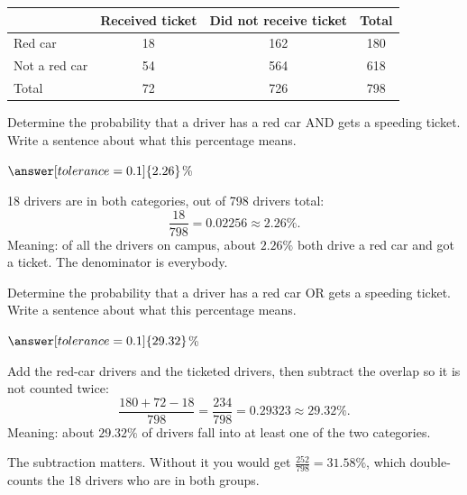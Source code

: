 \documentclass[12pt]{ximera}
\begin{document}
\begin{center}
\begin{tabular}{lccc}
\hline
 & Received ticket & Did not receive ticket & Total \\
\hline
Red car & 18 & 162 & 180 \\
Not a red car & 54 & 564 & 618 \\
\hline
Total & 72 & 726 & 798 \\
\hline
\end{tabular}
\end{center}

\begin{problem}
Determine the probability that a driver has a red car AND gets a speeding ticket. Write
a sentence about what this percentage means.

$\answer[tolerance=0.1]{2.26}$\%

\begin{freeResponse}
\end{freeResponse}

\begin{solution}
18 drivers are in both categories, out of 798 drivers total:
\[
\frac{18}{798} = 0.02256 \approx 2.26\%.
\]
Meaning: of all the drivers on campus, about $2.26\%$ both drive a red car and got a
ticket. The denominator is everybody.
\end{solution}
\end{problem}

\begin{problem}
Determine the probability that a driver has a red car OR gets a speeding ticket. Write a
sentence about what this percentage means.

$\answer[tolerance=0.1]{29.32}$\%

\begin{freeResponse}
\end{freeResponse}

\begin{solution}
Add the red-car drivers and the ticketed drivers, then subtract the overlap so it is not
counted twice:
\[
\frac{180 + 72 - 18}{798} = \frac{234}{798} = 0.29323 \approx 29.32\%.
\]
Meaning: about $29.32\%$ of drivers fall into at least one of the two categories.

The subtraction matters. Without it you would get $\frac{252}{798} = 31.58\%$, which
double-counts the 18 drivers who are in both groups.
\end{solution}
\end{problem}
\end{document}

